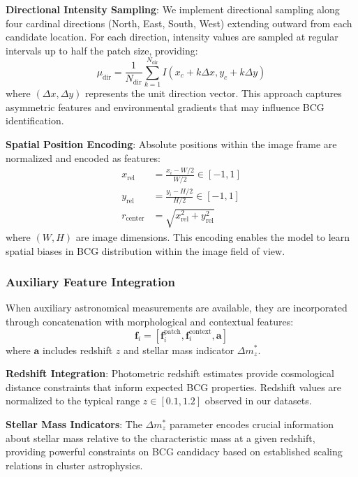 \documentclass[twocolumn,10pt]{aastex631}
\begin{document}
\textbf{Directional Intensity Sampling}: We implement directional sampling along four cardinal directions (North, East, South, West) extending outward from each candidate location. For each direction, intensity values are sampled at regular intervals up to half the patch size, providing:
\begin{equation}
\mu_{\text{dir}} = \frac{1}{N_{\text{dir}}} \sum_{k=1}^{N_{\text{dir}}} I(x_c + k\Delta x, y_c + k\Delta y)
\end{equation}
where $(\Delta x, \Delta y)$ represents the unit direction vector. This approach captures asymmetric features and environmental gradients that may influence BCG identification.

\textbf{Spatial Position Encoding}: Absolute positions within the image frame are normalized and encoded as features:
\begin{align}
x_{\text{rel}} &= \frac{x_i - W/2}{W/2} \in [-1, 1] \\
y_{\text{rel}} &= \frac{y_i - H/2}{H/2} \in [-1, 1] \\
r_{\text{center}} &= \sqrt{x_{\text{rel}}^2 + y_{\text{rel}}^2}
\end{align}
where $(W, H)$ are image dimensions. This encoding enables the model to learn spatial biases in BCG distribution within the image field of view.

\subsubsection{Auxiliary Feature Integration}

When auxiliary astronomical measurements are available, they are incorporated through concatenation with morphological and contextual features:
\begin{equation}
\mathbf{f}_i = [\mathbf{f}_i^{\text{patch}}, \mathbf{f}_i^{\text{context}}, \mathbf{a}]
\end{equation}
where $\mathbf{a}$ includes redshift $z$ and stellar mass indicator $\Delta m^*_z$.

\textbf{Redshift Integration}: Photometric redshift estimates provide cosmological distance constraints that inform expected BCG properties. Redshift values are normalized to the typical range $z \in [0.1, 1.2]$ observed in our datasets.

\textbf{Stellar Mass Indicators}: The $\Delta m^*_z$ parameter encodes crucial information about stellar mass relative to the characteristic mass at a given redshift, providing powerful constraints on BCG candidacy based on established scaling relations in cluster astrophysics.
\end{document}
